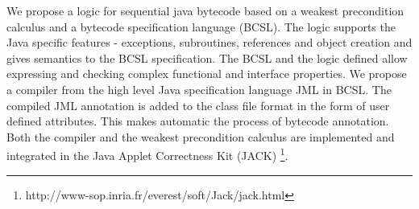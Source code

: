 We propose a logic for sequential java bytecode based on a weakest precondition calculus and a bytecode specification language (BCSL). 
The logic supports the Java specific features - exceptions, subroutines, references and object creation and gives semantics to the BCSL specification. The BCSL and the logic defined  allow expressing and checking complex functional and interface properties. We propose a compiler from the high level Java specification language JML in BCSL. The compiled JML annotation is added to the class file format in the form of user defined attributes. This makes automatic the process of bytecode annotation.  Both the compiler and the weakest precondition calculus are implemented and integrated in the Java Applet Correctness Kit (JACK) \footnote{http://www-sop.inria.fr/everest/soft/Jack/jack.html}.


